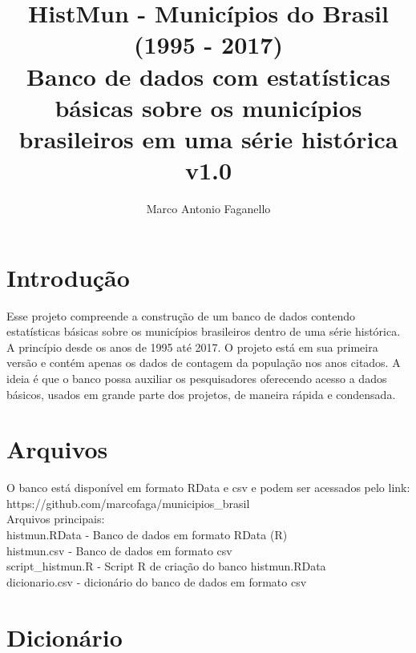 \documentclass[12pt, portuguese]{article}
\begin{document}
\title{%
  HistMun - Municípios do Brasil (1995 - 2017) \\
  \large  Banco de dados com estatísticas básicas sobre os municípios brasileiros em uma série histórica \\
  v1.0}

\author{Marco Antonio Faganello}

\maketitle

\section{Introdução}

Esse projeto compreende a construção de um banco de dados contendo estatísticas básicas sobre os municípios brasileiros dentro de uma série histórica. A princípio desde os anos de 1995 até 2017. O projeto está em sua primeira versão e contém apenas os dados de contagem da população nos anos citados. A ideia é que o banco possa auxiliar os pesquisadores oferecendo acesso a dados básicos, usados em grande parte dos projetos, de maneira rápida e condensada.

\section{Arquivos}

O banco está disponível em formato RData e csv e podem ser acessados pelo link: https://github.com/marcofaga/municipios\_brasil \\

\noindent
Arquivos principais:\\
histmun.RData - Banco de dados em formato RData (R)\\
histmun.csv - Banco de dados em formato csv\\
script\_histmun.R - Script R de criação do banco histmun.RData\\
dicionario.csv - dicionário do banco de dados em formato csv\\

\section{Dicionário}

\end{document}
